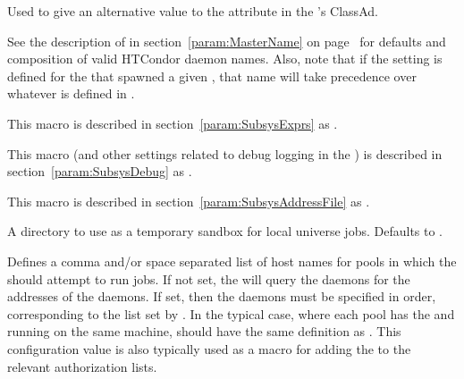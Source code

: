 \begin{description}
\label{param:ScheddName}
\item[\Macro{SCHEDD\_NAME}]
  Used to give an alternative value to the  attribute 
  in the 's ClassAd.

  See the description of  in
  section~\ref{param:MasterName} on page~\pageref{param:MasterName}
  for defaults and composition of valid HTCondor daemon names.
  Also, note that if the  setting is defined for
  the  that spawned a given , that name
  will take precedence over whatever is defined in
  . 

\label{param:ScheddAttrs}
\item[\Macro{SCHEDD\_ATTRS}]
  This macro is described in section~\ref{param:SubsysExprs} as
  .

\label{param:ScheddDebug}
\item[\Macro{SCHEDD\_DEBUG}]
  This macro
  (and other settings related to debug logging in the ) is
  described in section~\ref{param:SubsysDebug} as
  .

\label{param:ScheddAddressFile}
\item[\Macro{SCHEDD\_ADDRESS\_FILE}]
  This macro is described in
  section~\ref{param:SubsysAddressFile} as
  . 

\label{param:ScheddExecute}
\item[\Macro{SCHEDD\_EXECUTE}]
  A directory to use as a temporary sandbox for local universe jobs.
  Defaults to .

\label{param:FlockNegotiatorHosts} 
\item[\Macro{FLOCK\_NEGOTIATOR\_HOSTS}]
  Defines a comma and/or space separated list of  host
  names for pools in which the  should attempt to run jobs.
  If not set,
  the  will query the  daemons for 
  the addresses of the  daemons.
  If set, then the  daemons must be specified in order,
  corresponding to the list set by .
  In the typical case, where each pool
  has the  and  running on the 
  same machine,
   should have the same definition as
  .  This configuration value is also
  typically used as a macro for adding the  to the relevant
  authorization lists.


\end{description}
